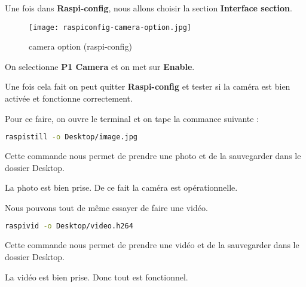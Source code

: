         \begin{flushleft}
            
            Une fois dans \textbf{Raspi-config}, nous allons choisir la section \textbf{Interface section}.
        
            \begin{figure}[ht]
                \centering
                \texttt{[image: raspiconfig-camera-option.jpg]} 
                \caption{camera option (raspi-config)}
            \end{figure}

            On selectionne \textbf{P1 Camera} et on met sur \textbf{Enable}.

            \vspace{0.2cm}

            Une fois cela fait on peut quitter \textbf{Raspi-config} et tester si la caméra est bien activée et fonctionne correctement.

            \vspace{0.2cm}

            Pour ce faire, on ouvre le terminal et on tape la commance suivante :

            \begin{flushleft}
                \begin{lstlisting}[language=bash]
                    raspistill -o Desktop/image.jpg
                \end{lstlisting}
            \end{flushleft}

            Cette commande nous permet de prendre une photo et de la sauvegarder dans le dossier Desktop.

            \vspace{0.2cm}

            La photo est bien prise. De ce fait la caméra est opérationnelle.

            Nous pouvons tout de même essayer de faire une vidéo.

            \begin{flushleft}
                \begin{lstlisting}[language=bash]
                    raspivid -o Desktop/video.h264
                \end{lstlisting}
            \end{flushleft}

            Cette commande nous permet de prendre une vidéo et de la sauvegarder dans le dossier Desktop.

            \vspace{0.2cm}

            La vidéo est bien prise. Donc tout est fonctionnel.
            
        \end{flushleft}

